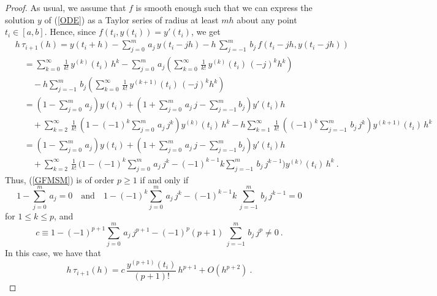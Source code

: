 \begin{proof}
As usual, we assume that $f$ is smooth enough such that we
can express the solution $y$ of (\ref{ODE}) as a Taylor series of
radius at least $m h$ about any point $t_i \in [a,b]$.  Hence, since
$f(t_i,y(t_i)) = y'(t_i)$, we get
\begin{align*}
&h\,\tau_{i+1}(h) = y(t_i+h) - \sum_{j=0}^m\,a_j\,y(t_i-jh)
-h\,\sum_{j=-1}^m\,b_j\,f(t_i-jh,y(t_i-jh)) \\
&\quad =
\sum_{k=0}^\infty\,\frac{1}{k!}\,y^{(k)}(t_i)\,h^k - \sum_{j=0}^m\,a_j
\left( \sum_{k=0}^\infty\,\frac{1}{k!}\,y^{(k)}(t_i)\,(-j)^kh^k \right) \\
&\quad\quad -h \sum_{j=-1}^m\,b_j
\left(\sum_{k=0}^\infty\,\frac{1}{k!}\,y^{(k+1)}(t_i)\,(-j)^kh^k \right)  \\
&\quad = \left( 1 - \sum_{j=0}^m\,a_j \right) y(t_i) +
\left( 1 + \sum_{j=0}^m\,a_j\, j - \sum_{j=-1}^m b_j \right) y'(t_i) h \\
&\quad\quad
+ \sum_{k=2}^\infty\,\frac{1}{k!}\,\left(1 - (-1)^k\sum_{j=0}^m\,a_j\,j^k\right) 
y^{(k)}(t_i)\,h^k 
-h\sum_{k=1}^\infty\,\frac{1}{k!}\,\left( (-1)^k\sum_{j=-1}^m\,b_j\,
j^k\right) y^{(k+1)}(t_i)\,h^k\\
&\quad = \left( 1 - \sum_{j=0}^m\,a_j \right) y(t_i) +
\left( 1 + \sum_{j=0}^m\,a_j\, j - \sum_{j=-1}^m b_j \right) y'(t_i) h \\
&\quad\quad
+ \sum_{k=2}^\infty\,\frac{1}{k!}\,\bigg( 1 - (-1)^k \sum_{j=0}^m\,a_j\,j^k
- (-1)^{k-1} k \sum_{j=-1}^m\,b_j\, j^{k-1}\bigg) y^{(k)}(t_i)\,h^k \ .
\end{align*}
Thus, (\ref{GFMSM}) is of order $p\geq 1$ if and only if
\begin{equation} \label{cond_order_p1}
1 - \sum_{j=0}^m\,a_j = 0 \quad \text{and} \quad
1 - (-1)^k \sum_{j=0}^m\,a_j\,j^k - (-1)^{k-1}k\,\sum_{j=-1}^m\,b_j\,j^{k-1} = 0
\end{equation}
for $1 \leq k \leq p$, and
\begin{equation} \label{cond_order_p2}
c \equiv 1 - (-1)^{p+1} \sum_{j=0}^m\,a_j\,j^{p+1}
- (-1)^p (p+1)\,\sum_{j=-1}^m\,b_j\,j^p \not= 0 \ .
\end{equation}
In this case, we have that
\[
h\,\tau_{i+1}(h) = c\, \frac{y^{(p+1)}(t_i)}{(p+1)!}\,h^{p+1} + O(h^{p+2}) \ .
\]


\end{proof}

